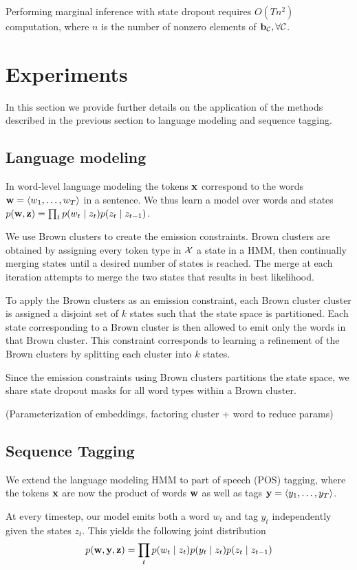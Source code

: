 \documentclass[11pt,a4paper]{article}
\begin{document}
Performing marginal inference with state dropout requires $O(Tn^2)$ computation,
where $n$ is the number of nonzero elements of $\mathbf{b}_{\mathcal{C}}, \forall \mathcal{C}$.


\section{Experiments}
In this section we provide further details on the application
of the methods described in the previous section
to language modeling and sequence tagging.

\subsection{Language modeling}
In word-level language modeling the tokens $\mathbf{x}$ correspond to the words
$\mathbf{w} = \langle w_1,\ldots,w_T \rangle$ in a sentence.
We thus learn a model over words and states
$p(\mathbf{w},\mathbf{z}) = \prod_t p(w_t\mid z_t)p(z_t \mid z_{t-1})$.

We use Brown clusters \citep{brown1992} to create the emission constraints.
Brown clusters are obtained by assigning every token type in $\mathcal{X}$ a state in a HMM,
then continually merging states until a desired number of states is reached.
The merge at each iteration attempts to merge the two states that results in best likelihood.

To apply the Brown clusters as an emission constraint,
each Brown cluster cluster is assigned a disjoint set of $k$ states
such that the state space is partitioned.
Each state corresponding to a Brown cluster is then allowed to emit only
the words in that Brown cluster.
This constraint corresponds to learning a refinement of the Brown clusters
by splitting each cluster into $k$ states.

Since the emission constraints using Brown clusters partitions the state space,
we share state dropout masks for all word types within a Brown cluster.

(Parameterization of embeddings, factoring cluster + word to reduce params)

\subsection{Sequence Tagging}
We extend the language modeling HMM to part of speech (POS) tagging,
where the tokens $\mathbf{x}$ are now the product of words $\mathbf{w}$ as well as tags
$\mathbf{y} = \langle y_1, \ldots, y_T \rangle$.

At every timestep, our model emits both a word $w_t$ and tag $y_t$
independently given the states $z_t$.
This yields the following joint distribution
\begin{equation}
\begin{aligned}
p(\mathbf{w}, \mathbf{y}, \mathbf{z})
&= \prod_t p(w_t \mid z_t)p(y_t \mid z_t)p(z_t\mid z_{t-1})\\
\end{aligned}
\end{equation}
\end{document}
